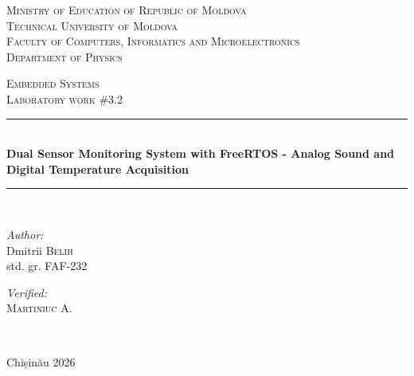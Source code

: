\documentclass[12pt]{article}
\begin{document}
\begin{titlepage}
	\thispagestyle{empty}
	
	\begin{center}
		\textsc{\large Ministry of Education of Republic of Moldova}\\[0.5cm]
		\textsc{\large Technical University of Moldova}\\[0.5cm]
		\textsc{\large Faculty of Computers, Informatics and Microelectronics}\\[0.5cm]
		\textsc{\large Department of Physics}\\[1.2cm]
	\end{center}

	\vspace{25 mm}

	\begin{center}
		\textsc{\large Embedded Systems}\\[0.5cm]
		\textsc{\large Laboratory work \#3.2}\\[0.5cm]

		\newcommand{\HRule}{\rule{\linewidth}{0.5mm}}
		\vspace{10 mm}
		\HRule \\[0.4cm]
		{ \LARGE \bfseries Dual Sensor Monitoring System with FreeRTOS - Analog Sound and Digital Temperature Acquisition}\\[0.4cm]
		\HRule \\[1.5cm]
	\end{center}

	\vspace{10mm}

	\begin{minipage}[t]{0.4\textwidth}
		\begin{flushleft} \large
			\emph{Author:} \\
			Dmitrii \textsc{Belih}\\
			std. gr. FAF-232
		\end{flushleft}
	\end{minipage}
	\hfill
	\begin{minipage}[t]{0.4\textwidth}
		\begin{flushright} \large
			\emph{Verified:} \\
			\textsc{Martiniuc} A.\\
		\end{flushright}
	\end{minipage}\\[3cm]

	\vspace{5 mm}
	\begin{center}
		\large Chișinău 2026\\[0.5cm]
	\end{center}

	\vfill
\end{titlepage}
\end{document}
